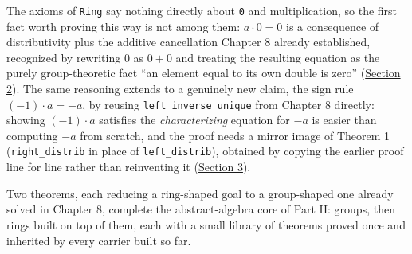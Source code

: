 The axioms of \texttt{Ring} say nothing directly about \texttt{0} and multiplication, so the first fact worth proving this way is not among them: \(a \cdot 0 =
0\) is a consequence of distributivity plus the additive cancellation Chapter 8 already established, recognized by rewriting \(0\) as \(0+0\) and treating the resulting equation as the purely group-theoretic fact ``an element equal to its own double is zero'' (\hyperref[sec:10-ring-theorems:02-theorem-1:1]{Section 2}). The same reasoning extends to a genuinely new claim, the sign rule \((-1)\cdot a = -a\), by reusing \texttt{left\_\allowbreak{}inverse\_\allowbreak{}unique} from Chapter 8 directly: showing \((-1)\cdot a\) satisfies the \emph{characterizing} equation for \(-a\) is easier than computing \(-a\) from scratch, and the proof needs a mirror image of Theorem 1 (\texttt{right\_\allowbreak{}distrib} in place of \texttt{left\_\allowbreak{}distrib}), obtained by copying the earlier proof line for line rather than reinventing it (\hyperref[sec:10-ring-theorems:03-theorem-2:1]{Section 3}).

Two theorems, each reducing a ring-shaped goal to a group-shaped one already solved in Chapter 8, complete the abstract-algebra core of Part II: groups, then rings built on top of them, each with a small library of theorems proved once and inherited by every carrier built so far.






